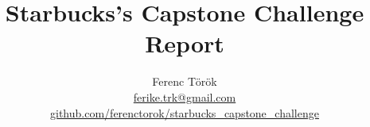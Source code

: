 \documentclass[11pt,oneside,a4paper]{report}
\title{Starbucks's Capstone Challenge \\ 
		Report}
\author{Ferenc Török \\ \href{mailto:ferike.trk@gmail.com}{ferike.trk@gmail.com} \\
						\href{https://github.com/ferenctorok/starbucks_capstone_challenge}
						{github.com/ferenctorok/starbucks\_capstone\_challenge}}
\begin{document}
	
	\maketitle
	
	\tableofcontents
	
	\pagebreak
	
	
	
	
	
	
	
	
\end{document}
